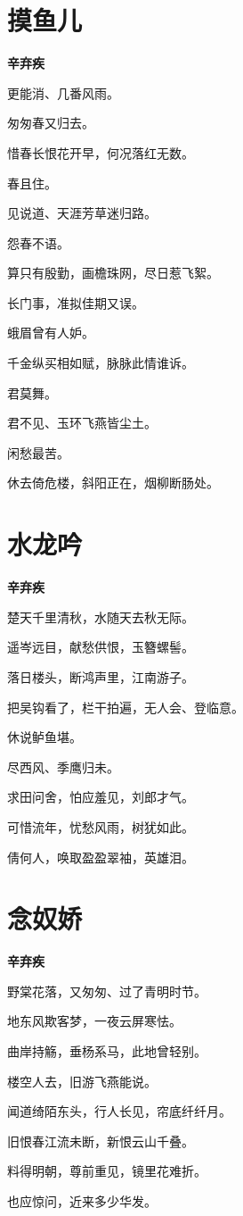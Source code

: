 \documentclass[12pt,a4paper]{ctexbook}
\begin{document}
\section{摸鱼儿}
\textbf{辛弃疾}\par\vspace{0.5em}
更能消、几番风雨。\par
匆匆春又归去。\par
惜春长恨花开早，何况落红无数。\par
春且住。\par
见说道、天涯芳草迷归路。\par
怨春不语。\par
算只有殷勤，画檐珠网，尽日惹飞絮。\par
长门事，准拟佳期又误。\par
蛾眉曾有人妒。\par
千金纵买相如赋，脉脉此情谁诉。\par
君莫舞。\par
君不见、玉环飞燕皆尘土。\par
闲愁最苦。\par
休去倚危楼，斜阳正在，烟柳断肠处。\par

\section{水龙吟}
\textbf{辛弃疾}\par\vspace{0.5em}
楚天千里清秋，水随天去秋无际。\par
遥岑远目，献愁供恨，玉簪螺髻。\par
落日楼头，断鸿声里，江南游子。\par
把吴钩看了，栏干拍遍，无人会、登临意。\par
休说鲈鱼堪。\par
尽西风、季鹰归未。\par
求田问舍，怕应羞见，刘郎才气。\par
可惜流年，忧愁风雨，树犹如此。\par
倩何人，唤取盈盈翠袖，英雄泪。\par

\section{念奴娇}
\textbf{辛弃疾}\par\vspace{0.5em}
野棠花落，又匆匆、过了青明时节。\par
地东风欺客梦，一夜云屏寒怯。\par
曲岸持觞，垂杨系马，此地曾轻别。\par
楼空人去，旧游飞燕能说。\par
闻道绮陌东头，行人长见，帘底纤纤月。\par
旧恨春江流未断，新恨云山千叠。\par
料得明朝，尊前重见，镜里花难折。\par
也应惊问，近来多少华发。\par
\end{document}
